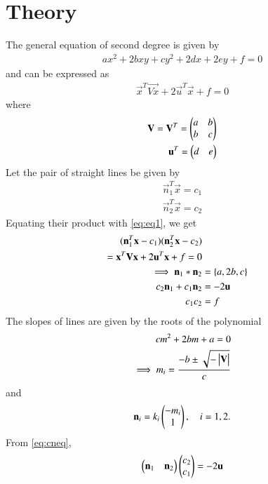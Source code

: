 \documentclass[journal,12pt,twocolumn]{IEEEtran}
\begin{document}
\section{Theory}
The general equation of second degree is given by 
\begin{align} 
	ax^2 + 2bxy + cy^2 + 2dx + 2ey + f = 0 \label{eq:geneq}
\end{align}
and can be expressed as 
\begin{align}
	\vec{x}^T\vec{Vx} + 2\vec{u}^T\vec{x} + f = 0 \label{eq:eq1}
\end{align}
where 
\begin{align}
	\mathbf{V} = \mathbf{V}^T = \begin{pmatrix}a & b\\b & c\end{pmatrix} \label{eq:eq2} \\
	\mathbf{u}^T = \begin{pmatrix}d & e\end{pmatrix} \label{eq:eq3}
\end{align}
Let the pair of straight lines be given by 
\begin{align}
	\vec{n}_1^T\vec{x} = c_1\\
	\vec{n}_2^T\vec{x} = c_2
\end{align}
Equating their product with \eqref{eq:eq1}, we get
\begin{align}
	(\mathbf{n}_1^T\mathbf{x} - c_1)(\mathbf{n}_2^T\mathbf{x} - c_2) \nonumber \\
	= \mathbf{x}^T\mathbf{Vx} + 2\mathbf{u}^T\mathbf{x} + f = 0 \label{eq:eq4} \\
	\implies \mathbf{n}_1 * \mathbf{n}_2 &= \left\{a, 2b, c\right\} \label{eq:n1n2} \\
	c_2\mathbf{n}_1 + c_1\mathbf{n}_2 &= -2\mathbf{u} \label{eq:cneq} \\
	c_1c_2 &= f \label{eq:c1c2}
\end{align}
The slopes of lines are given by the roots of the polynomial
\begin{align}
	cm^2 + 2bm + a = 0 \label{eq:poly}\\
	\implies m_i = \frac{-b \pm \sqrt{- \begin{vmatrix}\mathbf{V}\end{vmatrix}}}{c} \label{eq:mval}
\end{align}
and
\begin{align}
	\mathbf{n}_i = k_i \begin{pmatrix}-m_i \\ 1\end{pmatrix},  \quad i = 1,2. \label{eq:nval}
\end{align}
From \eqref{eq:cneq},
\begin{align}
	\begin{pmatrix}\mathbf{n}_1 & \mathbf{n}_2\end{pmatrix} \begin{pmatrix}c_2 \\ c_1\end{pmatrix} = -2\mathbf{u} \label{eq:result}
\end{align}
\end{document}
